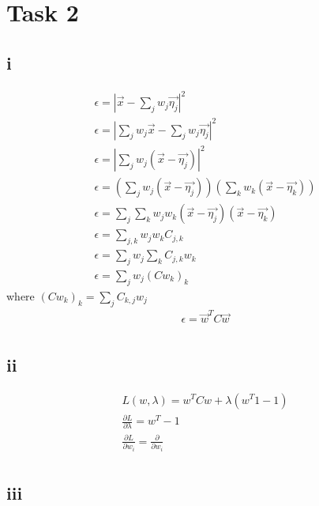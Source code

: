 \section*{Task 2}

\subsection*{i}

\begin{gather*}
\epsilon = |\vec{x}  - \sum_j w_j \vec{\eta_j}|^2 \\
\epsilon = |\sum_j w_j \vec{x} -  \sum_j w_j \vec{\eta_j}|^2 \\
\epsilon = |\sum_j w_j (\vec{x} - \vec{\eta_j})|^2 \\
\epsilon = (\sum_j w_j (\vec{x} - \vec{\eta_j})) (\sum_k w_k (\vec{x} - \vec{\eta_k})) \\
\epsilon = \sum_j \sum_k w_j w_k  (\vec{x} - \vec{\eta_j}) (\vec{x} - \vec{\eta_k}) \\
\epsilon = \sum_{j,k} w_j w_k C_{j,k} \\
\epsilon = \sum_j w_j \sum_k C_{j,k} w_k \\
\epsilon = \sum_j w_j (C w_k)_k
\end{gather*}
where $(C w_k)_k = \sum_j C_{k,j} w_j$
\begin{gather*}
\epsilon = \vec{w}^TC\vec{w} \\
\end{gather*}


\subsection*{ii}

\begin{gather*}
L(w,\lambda) = w^T Cw + \lambda(w^T 1 - 1) \\
\frac{\partial L}{\partial \lambda} = w^T  -1 \\
\frac{\partial L}{\partial w_i} = \frac{\partial}{\partial w_i} \\
\end{gather*}
\subsection*{iii}


\clearpage
